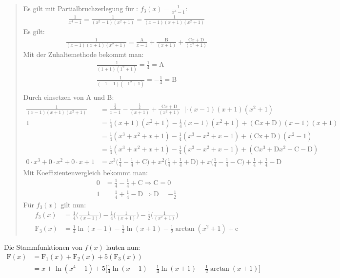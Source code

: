 \begin{quote}
	Es gilt mit Partialbruchzerlegung für : $ f_3(x)=\frac{1}{x^4-1} $:\\
	\begin{align*}
	\frac{1}{x^4-1}=\frac{1}{(x^2-1)(x^2+1)}=\frac{1}{(x-1)(x+1)(x^2+1)}
	\end{align*}
	Es gilt:\\
	\begin{align*}
	\frac{1}{(x-1)(x+1)(x^2+1)}=\frac{\mathrm{A}}{x-1}+\frac{\mathrm{B}}{(x+1)}+\frac{\mathrm{C}x+\mathrm{D}}{(x^2+1)}
	\end{align*}
	Mit der \glqq Zuhaltemethode \grqq bekommt man:\\
	\begin{align*}
	\frac{1}{(1+1)(1^2+1)}=\frac{1}{4}=\mathrm{A}\\
	\frac{1}{(-1-1)(-1^2+1)}=-\frac{1}{4}=\mathrm{B}\\
	\end{align*}
	Durch einsetzen von A und B:\\
	\begin{align*}
	\frac{1}{(x-1)(x+1)(x^2+1)}&=\frac{\frac{1}{4}}{x-1}-\frac{\frac{1}{4}}{(x+1)}+\frac{\mathrm{C}x+\mathrm{D}}{(x^2+1)}\;\;|\cdot \scriptscriptstyle (x-1)(x+1)(x^2+1)\\
	1&=\frac{1}{4}(x+1)(x^2+1)-\frac{1}{4}(x-1)(x^2+1)+(\mathrm{C}x+\mathrm{D})(x-1)(x+1)\\
	&=\frac{1}{4}(x^3+x^2+x+1)-\frac{1}{4}(x^3-x^2+x-1)+(\mathrm{Cx}+\mathrm{D})(x^2-1)\\
		&=\frac{1}{4}(x^3+x^2+x+1)-\frac{1}{4}(x^3-x^2+x-1)+(\mathrm{C}x^3+\mathrm{D}x^2-\mathrm{C}-\mathrm{D})\\
	0\cdot x^3+	0\cdot x^2+	0\cdot x+1&=x^3\bigg(\frac{1}{4}-\frac{1}{4}+\mathrm{C}\bigg)+x^2\bigg(\frac{1}{4}+\frac{1}{4}+\mathrm{D}\bigg)+x\bigg(\frac{1}{4}-\frac{1}{4}-\mathrm{C}\bigg)+\frac{1}{4}+\frac{1}{4}-\mathrm{D}
	\end{align*}
	Mit Koeffizientenvergleich bekommt man:\\
	\begin{align*}
	0&=\frac{1}{4}-\frac{1}{4}+\mathrm{C}\Rightarrow\mathrm{C}=0\\
	1&=\frac{1}{4}+\frac{1}{4}-\mathrm{D}\Rightarrow\mathrm{D}=-\frac{1}{2}
	\end{align*}
	Für $ f_3(x) $ gilt nun:\\
	\begin{align*}
	f_3(x)&=\frac{1}{4}\bigg(\frac{1}{(x-1)}\bigg)-\frac{1}{4}\bigg(\frac{1}{(x+1)}\bigg)-\frac{1}{2}\bigg(\frac{1}{(x^2+1)}\bigg)\\
	\mathrm{F}_3(x)&=\frac{1}{4}\ln(x-1)-\frac{1}{4}\ln(x+1)-\frac{1}{2}\arctan(x^2+1)+\mathrm{c}
	\end{align*}
\end{quote}
Die Stammfunktionen von $ f(x) $ lauten nun:\\
\begin{align*}
\mathrm{F}(x)&=\mathrm{F_1}(x)+\mathrm{F_2}(x)+5(\mathrm{F_3}(x))\\
&=x+\ln(x^4-1)+5\bigg[\frac{1}{4}\ln(x-1)-\frac{1}{4}\ln(x+1)-\frac{1}{2}\arctan(x+1)\bigg]
\end{align*}




